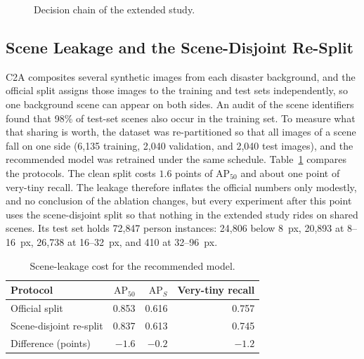 \documentclass[12pt,a4paper,oneside]{report}
\begin{document}
\begin{figure}[tbp]
  \centering
  \caption{Decision chain of the extended study.}
  \label{fig:partbchain}
\end{figure}

\subsection{Scene Leakage and the Scene-Disjoint Re-Split}
\label{sec:leak}
C2A composites several synthetic images from each disaster background, and the
official split assigns those images to the training and test sets
independently, so one background scene can appear on both sides. An audit of
the scene identifiers found that 98\% of test-set scenes also occur in the
training set. To measure what that sharing is worth, the dataset was
re-partitioned so that all images of a scene fall on one side (6{,}135
training, 2{,}040 validation, and 2{,}040 test images), and the recommended
model was retrained under the same schedule. Table~\ref{tab:leak} compares the
protocols. The clean split costs $1.6$ points of $\mathrm{AP}_{50}$ and about
one point of very-tiny recall. The leakage therefore inflates the official
numbers only modestly, and no conclusion of the ablation changes, but every
experiment after this point uses the scene-disjoint split so that nothing in
the extended study rides on shared scenes. Its test set holds 72{,}847 person
instances: 24{,}806 below 8~px, 20{,}893 at 8--16~px, 26{,}738 at 16--32~px,
and 410 at 32--96~px.

\begin{table}[tbp]
  \centering
  \caption{Scene-leakage cost for the recommended model.}
  \label{tab:leak}
  \begin{tabular}{|l|r|r|r|}
    \hline
    Protocol & $\mathrm{AP}_{50}$ & $\mathrm{AP}_S$ & Very-tiny recall \\
    \hline
    Official split          & 0.853 & 0.616 & 0.757 \\ \hline
    Scene-disjoint re-split & 0.837 & 0.613 & 0.745 \\ \hline
    Difference (points)     & $-1.6$ & $-0.2$ & $-1.2$ \\
    \hline
  \end{tabular}
\end{table}
\end{document}

